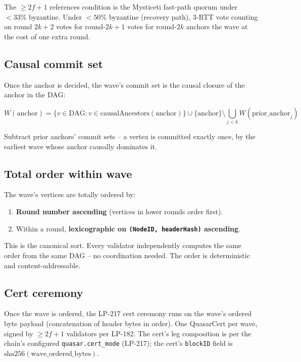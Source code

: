 The $\geq 2f{+}1$ references condition is the Mysticeti fast-path
quorum under $<33\%$ byzantine. Under $<50\%$ byzantine (recovery
path), 3-RTT vote counting on round $2k{+}2$ votes for round-$2k{+}1$
votes for round-$2k$ anchors the wave at the cost of one extra
round.

\subsection{Causal commit set}

Once the anchor is decided, the wave's commit set is the causal
closure of the anchor in the DAG:

\begin{equation}
W(\textrm{anchor}) = \bigl\{ v \in \textrm{DAG} : v \in
\textrm{causalAncestors}(\textrm{anchor}) \bigr\}
\cup \{\textrm{anchor}\}
\setminus \bigcup_{j<k} W(\textrm{prior\_anchor}_j)
\end{equation}

Subtract prior anchors' commit sets -- a vertex is committed
exactly once, by the earliest wave whose anchor causally dominates
it.

\subsection{Total order within wave}

The wave's vertices are totally ordered by:

\begin{enumerate}[leftmargin=2em,nosep]
\item \textbf{Round number ascending} (vertices in lower rounds
  order first).
\item Within a round, \textbf{lexicographic on
  \texttt{(NodeID, headerHash)} ascending}.
\end{enumerate}

This is the canonical sort. Every validator independently computes
the same order from the same DAG -- no coordination needed. The
order is deterministic and content-addressable.

\subsection{Cert ceremony}

Once the wave is ordered, the LP-217 cert ceremony runs on the
wave's ordered byte payload (concatenation of header bytes in
order). One QuasarCert per wave, signed by $\geq 2f{+}1$ validators
per LP-182. The cert's leg composition is per the chain's
configured \texttt{quasar.cert\_mode} (LP-217); the cert's
\texttt{blockID} field is $\textrm{sha256}(\textrm{wave\_ordered\_bytes})$.

